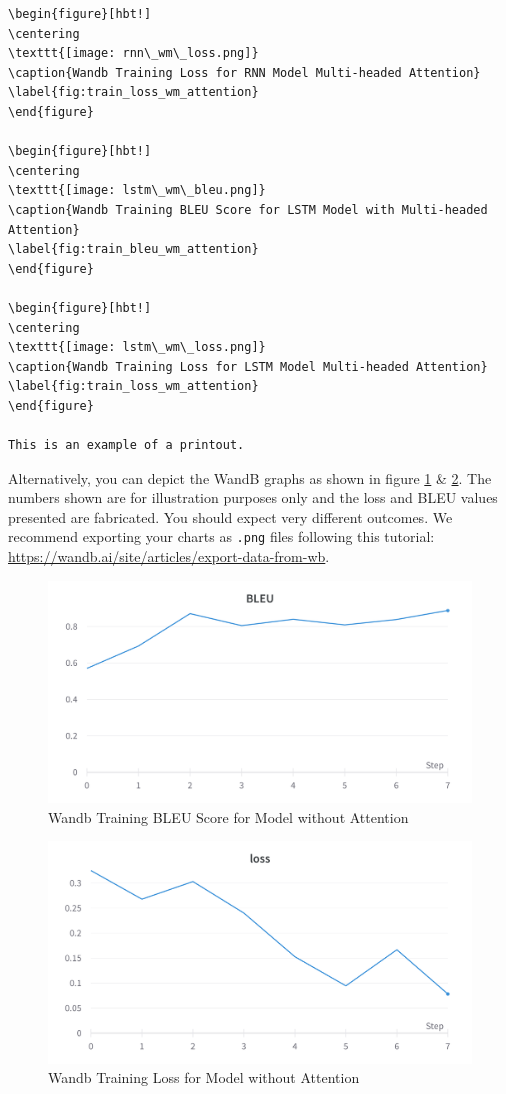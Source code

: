 \documentclass[11pt]{article}
\begin{document}
\begin{verbatim}
\begin{figure}[hbt!]
\centering
\texttt{[image: rnn\_wm\_loss.png]}
\caption{Wandb Training Loss for RNN Model Multi-headed Attention}
\label{fig:train_loss_wm_attention}
\end{figure}

\begin{figure}[hbt!]
\centering
\texttt{[image: lstm\_wm\_bleu.png]}
\caption{Wandb Training BLEU Score for LSTM Model with Multi-headed Attention}
\label{fig:train_bleu_wm_attention}
\end{figure}

\begin{figure}[hbt!]
\centering
\texttt{[image: lstm\_wm\_loss.png]}
\caption{Wandb Training Loss for LSTM Model Multi-headed Attention}
\label{fig:train_loss_wm_attention}
\end{figure}

This is an example of a printout.
\end{verbatim}

Alternatively, you can depict the WandB graphs as shown in figure \ref{fig:train_bleu_wo_attention} \& \ref{fig:train_loss_wo_attention}. The numbers shown are for illustration purposes only and the loss and BLEU values presented are fabricated. You should expect very different outcomes.  We recommend exporting your charts as {\tt .png} files following this tutorial: \url{https://wandb.ai/site/articles/export-data-from-wb}.

\begin{figure}[hbt!]
\centering
\includegraphics[width=0.65\linewidth]{./wandb_bleu.png}
\caption{Wandb Training BLEU Score for Model without Attention}
\label{fig:train_bleu_wo_attention}
\end{figure}

\begin{figure}[hbt!]
\centering
\includegraphics[width=0.65\linewidth]{./wandb_loss.png}
\caption{Wandb Training Loss for Model without Attention}
\label{fig:train_loss_wo_attention}
\end{figure}
\end{document}
